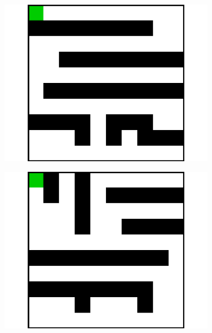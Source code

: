 \documentclass{article}
\begin{document}
\begin{figure}[t]
  \begin{subfigure}[t]{0.18\textwidth}
    \includegraphics[width=\textwidth]{images/maze/maze5.pdf}
    \caption{}
  \end{subfigure}
  \begin{subfigure}[t]{0.18\textwidth}
    \includegraphics[width=\textwidth]{images/maze/maze6.pdf}
    \caption{}\label{fig:maze6}
  \end{subfigure}
  \begin{subfigure}[t]{0.18\textwidth}

\end{subfigure}
\end{figure}
\end{document}
